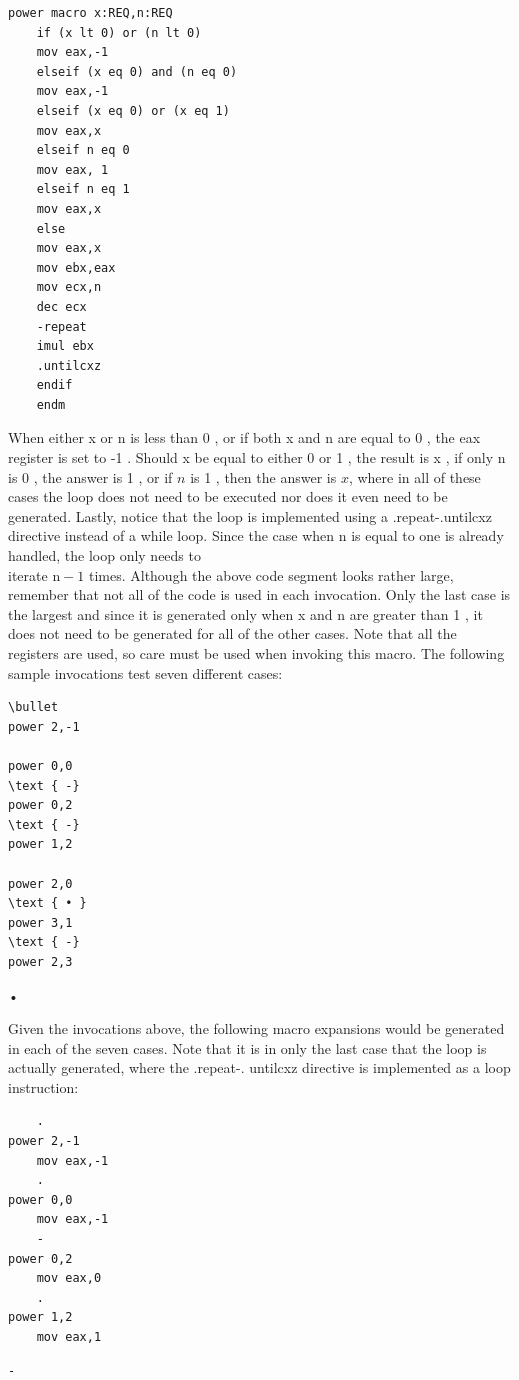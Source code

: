 \documentclass[10pt]{article}
\begin{document}
\begin{verbatim}
power macro x:REQ,n:REQ
    if (x lt 0) or (n lt 0)
    mov eax,-1
    elseif (x eq 0) and (n eq 0)
    mov eax,-1
    elseif (x eq 0) or (x eq 1)
    mov eax,x
    elseif n eq 0
    mov eax, 1
    elseif n eq 1
    mov eax,x
    else
    mov eax,x
    mov ebx,eax
    mov ecx,n
    dec ecx
    -repeat
    imul ebx
    .untilcxz
    endif
    endm
\end{verbatim}

When either x or n is less than 0 , or if both x and n are equal to 0 , the eax register is set to -1 . Should x be equal to either 0 or 1 , the result is x , if only n is 0 , the answer is 1 , or if $n$ is 1 , then the answer is $x$, where in all of these cases the loop does not need to be executed nor does it even need to be generated. Lastly, notice that the loop is implemented using a .repeat-.untilcxz directive instead of a while loop. Since the case when n is equal to one is already handled, the loop only needs to\\
iterate $\mathrm{n}-1$ times. Although the above code segment looks rather large, remember that not all of the code is used in each invocation. Only the last case is the largest and since it is generated only when x and n are greater than 1 , it does not need to be generated for all of the other cases. Note that all the registers are used, so care must be used when invoking this macro. The following sample invocations test seven different cases:

\begin{verbatim}
\bullet
power 2,-1
  
power 0,0
\text { -}
power 0,2
\text { -}
power 1,2
  
power 2,0
\text { • }
power 3,1
\text { -}
power 2,3
\end{verbatim}

•

Given the invocations above, the following macro expansions would be generated in each of the seven cases. Note that it is in only the last case that the loop is actually generated, where the .repeat-. untilcxz directive is implemented as a loop instruction:

\begin{verbatim}
    .
power 2,-1
    mov eax,-1
    .
power 0,0
    mov eax,-1
    -
power 0,2
    mov eax,0
    .
power 1,2
    mov eax,1
\end{verbatim}

\begin{verbatim}
-
\end{verbatim}
\end{document}
